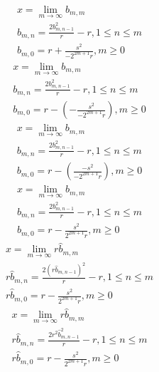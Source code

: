 \documentclass[a4paper,12pt]{report}
\begin{document}
\begin{subequations}
\begin{gather}
x = \lim \limits_{m \to \infty} b_{m,m} \\
b_{m,n} = \frac{2b_{m,n-1}^2}{r} - r, 1 \leq n \leq m \\
b_{m,0} = r + \frac{s^2}{-2^{2m+1}r}, m \geq 0
\end{gather}
\end{subequations}
\begin{subequations}
\begin{gather}
x = \lim \limits_{m \to \infty} b_{m,m} \\
b_{m,n} = \frac{2b_{m,n-1}^2}{r} - r, 1 \leq n \leq m \\
b_{m,0} = r - \left(-\frac{s^2}{-2^{2m+1}r}\right), m \geq 0
\end{gather}
\end{subequations}
\begin{subequations}
\begin{gather}
x = \lim \limits_{m \to \infty} b_{m,m} \\
b_{m,n} = \frac{2b_{m,n-1}^2}{r} - r, 1 \leq n \leq m \\
b_{m,0} = r - \left(\frac{-s^2}{-2^{2m+1}r}\right), m \geq 0
\end{gather}
\end{subequations}
\begin{subequations}
\begin{gather}
x = \lim \limits_{m \to \infty} b_{m,m} \\
b_{m,n} = \frac{2b_{m,n-1}^2}{r} - r, 1 \leq n \leq m \\
b_{m,0} = r - \frac{s^2}{2^{2m+1}r}, m \geq 0
\end{gather}
\end{subequations}
\begin{subequations}
\begin{gather}
x = \lim \limits_{m \to \infty} r \hat{b}_{m,m} \\
r \hat{b}_{m,n} = \frac{2 (r \hat{b}_{m,n-1})^2}{r} - r, 1 \leq n \leq m \\
r \hat{b}_{m,0} = r - \frac{s^2}{2^{2m+1}r}, m \geq 0
\end{gather}
\end{subequations}
\begin{subequations}
\begin{gather}
x = \lim \limits_{m \to \infty} r \hat{b}_{m,m} \\
r \hat{b}_{m,n} = \frac{2r^2 \hat{b}_{m,n-1}^2}{r} - r, 1 \leq n \leq m \\
r \hat{b}_{m,0} = r - \frac{s^2}{2^{2m+1}r}, m \geq 0
\end{gather}
\end{subequations}
\end{document}
